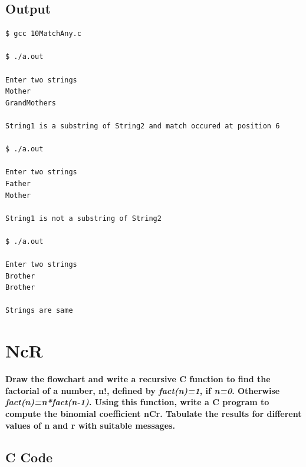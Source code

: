 \documentclass[a4paper]{report}
\begin{document}
\section*{Output}
\begin{Verbatim}
$ gcc 10MatchAny.c

$ ./a.out 

Enter two strings
Mother
GrandMothers

String1 is a substring of String2 and match occured at position 6

$ ./a.out 

Enter two strings
Father 
Mother

String1 is not a substring of String2

$ ./a.out 

Enter two strings
Brother
Brother

Strings are same

\end{Verbatim}

\chapter{NcR}
{\selectfont \textbf{Draw the flowchart and write a recursive C function to find the factorial of a number, n!, defined by \textit{fact(n)=1}, if \textit{n=0}. Otherwise \textit{fact(n)=n*fact(n-1)}. Using this function, write a C program to compute the binomial coefficient nCr. Tabulate the results for different values of n and r with suitable messages.
}}

\section*{C Code}
\end{document}
